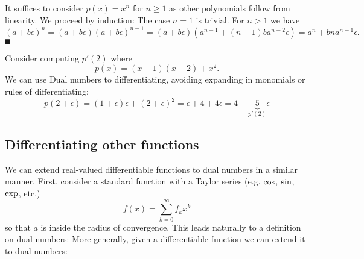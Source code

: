 It suffices to consider $p(x) = x^n$ for $n \ensuremath{\geq} 1$ as other polynomials follow from linearity. We proceed by induction: The case $n = 1$ is trivial. For $n > 1$ we have 
\[
(a + b \ensuremath{\epsilon})^n = (a + b \ensuremath{\epsilon}) (a + b \ensuremath{\epsilon})^{n-1} = (a + b \ensuremath{\epsilon}) (a^{n-1} + (n-1) b a^{n-2} \ensuremath{\epsilon}) = a^n + b n a^{n-1} \ensuremath{\epsilon}.
\]
\ensuremath{\QED}

\begin{example} Consider computing $p'(2)$ where
\[
p(x) = (x-1)(x-2) + x^2.
\]
We can use Dual numbers to differentiating, avoiding expanding in monomials or rules of differentiating:
\[
p(2+\ensuremath{\epsilon}) = (1+\ensuremath{\epsilon})\ensuremath{\epsilon} + (2+\ensuremath{\epsilon})^2 = \ensuremath{\epsilon} + 4 + 4\ensuremath{\epsilon} = 4 + \underbrace{5}_{p'(2)}\ensuremath{\epsilon}
\]
\end{example}

\subsection{Differentiating other functions}
We can extend real-valued differentiable functions to dual numbers in a similar manner. First, consider a standard function with a Taylor series (e.g. ${\rm cos}$, ${\rm sin}$, ${\rm exp}$, etc.)
\[
f(x) = \ensuremath{\sum}_{k=0}^\ensuremath{\infty} f_k x^k
\]
so that $a$ is inside the radius of convergence. This leads naturally to a definition on dual numbers:
More generally, given a differentiable function we can extend it to dual numbers:

